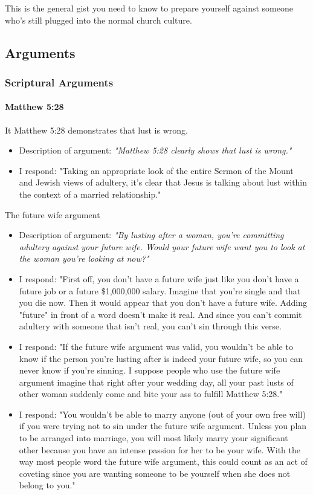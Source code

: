 \documentclass[a4paper, parskip=full, 15pt]{article}
\begin{document}
This is the general gist you need to know to prepare yourself against someone who's still plugged into the normal church culture.
\subsection{Arguments}
\subsubsection{Scriptural Arguments}
\paragraph{Matthew 5:28}
It Matthew 5:28 demonstrates that lust is wrong.
  \begin{itemize}
    \item Description of argument: \textit{"Matthew 5:28 clearly shows that lust is wrong."}
    \item I respond: "Taking an appropriate look of the entire Sermon of the Mount and Jewish views of adultery, it's clear that Jesus is talking about lust within the context of a married relationship."
  \end{itemize}
  \item The future wife argument
  \begin{itemize}
    \item Description of argument: \textit{"By lusting after a woman, you're committing adultery against your future wife. Would your future wife want you to look at the woman you're looking at now?"}
    \item I respond: "First off, you don't have a future wife just like you don't have a future job or a future \$1,000,000 salary. Imagine that you're single and that you die now. Then it would appear that you don't have a future wife. Adding "future" in front of a word doesn't make it real. And since you can't commit adultery with someone that isn't real, you can't sin through this verse.
    \item I respond: "If the future wife argument was valid, you wouldn't be able to know if the person you're lusting after is indeed your future wife, so you can never know if you're sinning. I suppose people who use the future wife argument imagine that right after your wedding day, all your past lusts of other woman suddenly come and bite your ass to fulfill Matthew 5:28."
    \item I respond: "You wouldn't be able to marry anyone (out of your own free will) if you were trying not to sin under the future wife argument. Unless you plan to be arranged into marriage, you will most likely marry your significant other because you have an intense passion for her to be your wife. With the way most people word the future wife argument, this could count as an act of coveting since you are wanting someone to be yourself when she does not belong to you."
  \end{itemize}
\end{document}
